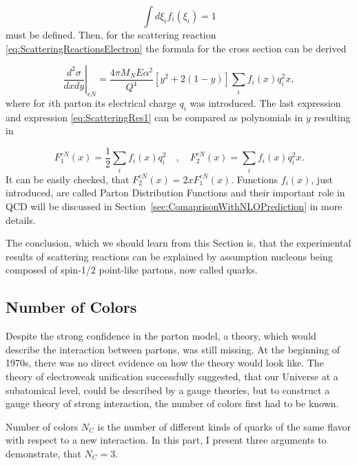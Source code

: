 \begin{equation}
  \int d\xi_i f_i(\xi_i) = 1
  \label{eq:PartonDensityFunctionsNormalization}
\end{equation}
must be defined. Then, for the scattering reaction
\eqref{eq:ScatteringReactionsElectron} the formula for the cross section
can be derived

\begin{equation}
  \left. \frac{d^2\sigma}{dxdy} \right|_{eN} =
  \frac{4 \pi M_N E \alpha^2}{Q^4} \left[ y^2 + 2 ( 1 - y ) \right]
  \sum_i f_i(x) q_i^2 x,
  \label{eg:ScatteringRes2}
\end{equation}
where for $i$th parton its electrical charge $q_i$ was introduced. The last
expression and expression \eqref{eq:ScatteringRes1} can be compared as polynomials in $y$
resulting in

\begin{equation}
  F_1^{eN}(x) = \frac{1}{2} \sum_i f_i(x)q_i^2
  \quad , \quad
  F_2^{eN}(x) = \sum_i f_i(x) q_i^2 x.
  \label{eq:StructureFunctionAndPDF}
\end{equation}
It can be easily checked, that $F_2^{eN}(x) = 2 x F_1^{eN}(x)$. Functions
$f_i(x)$, just introduced, are called Parton Distribution Functions and their
important role in QCD will be discussed in
Section~\ref{sec:ComaprisonWithNLOPrediction} in more details.

The conclusion, which we should learn from this Section is, that the
experimental results of scattering reactions can be explained by assumption
nucleons being composed of spin-1/2 point-like partons, now called quarks. 

\subsection{Number of Colors}

Despite the strong confidence in the parton model, a theory, which would describe the
interaction between partons, was still missing. At the beginning of 1970s, there
was no direct evidence on how the theory would look like.
The theory of electroweak unification successfully suggested, that our Universe
at a subatomical level, could be described by a gauge theories, but 
to construct a gauge theory of strong interaction, the number of colors first had
to be known.

Number of colors $N_C$ is the number of different kinds of quarks of the same
flavor with respect to a new interaction. In this part, I present three arguments 
to demonstrate, that $N_C = 3$.

